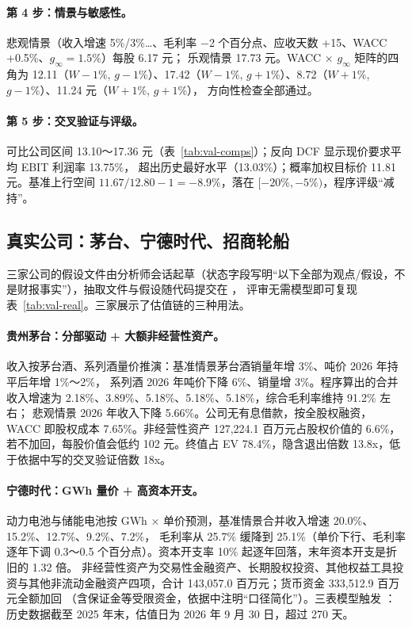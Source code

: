 \paragraph{第 4 步：情景与敏感性。} 悲观情景（收入增速 5\%/3\%…、毛利率 −2 个百分点、应收天数 +15、WACC +0.5\%、$g_\infty=1.5\%$）每股 6.17 元；
乐观情景 17.73 元。WACC × $g_\infty$ 矩阵的四角为 12.11（$W-1\%$, $g-1\%$）、17.42（$W-1\%$, $g+1\%$）、8.72（$W+1\%$, $g-1\%$）、11.24 元（$W+1\%$, $g+1\%$），
方向性检查全部通过。

\paragraph{第 5 步：交叉验证与评级。} 可比公司区间 13.10～17.36 元（表~\ref{tab:val-comps}）；反向 DCF 显示现价要求平均 EBIT 利润率 13.75\%，
超出历史最好水平（13.03\%）；概率加权目标价 11.81 元。基准上行空间 $11.67/12.80-1=-8.9\%$，落在 $[-20\%,-5\%)$，程序评级“减持”。

\subsection{真实公司：茅台、宁德时代、招商轮船}
\label{sec:val-realcases}

三家公司的假设文件由分析师会话起草（状态字段写明“以下全部为观点/假设，不是财报事实”），抽取文件与假设随代码提交在 ，
评审无需模型即可复现表~\ref{tab:val-real}。三家展示了估值链的三种用法。

\paragraph{贵州茅台：分部驱动 + 大额非经营性资产。} 收入按茅台酒、系列酒量价推演：基准情景茅台酒销量年增 3\%、吨价 2026 年持平后年增 1\%～2\%，
系列酒 2026 年吨价下降 6\%、销量增 3\%。程序算出的合并收入增速为 2.18\%、3.89\%、5.18\%、5.18\%、5.18\%，综合毛利率维持 91.2\% 左右；
悲观情景 2026 年收入下降 5.66\%。公司无有息借款，按全股权融资，WACC 即股权成本 7.65\%。非经营性资产 127,224.1 百万元占股权价值的 6.6\%，
若不加回，每股价值会低约 102 元。终值占 EV 78.4\%，隐含退出倍数 13.8x，低于依据中写的交叉验证倍数 18x。

\paragraph{宁德时代：GWh 量价 + 高资本开支。} 动力电池与储能电池按 GWh × 单价预测，基准情景合并收入增速 20.0\%、15.2\%、12.7\%、9.2\%、7.2\%，
毛利率从 25.7\% 缓降到 25.1\%（单价下行、毛利率逐年下调 0.3～0.5 个百分点）。资本开支率 10\% 起逐年回落，末年资本开支是折旧的 1.32 倍。
非经营性资产为交易性金融资产、长期股权投资、其他权益工具投资与其他非流动金融资产四项，合计 143,057.0 百万元；货币资金 333,512.9 百万元全额加回
（含保证金等受限资金，依据中注明“口径简化”）。三表模型触发 ：历史数据截至 2025 年末，估值日为 2026 年 9 月 30 日，超过 270 天。

